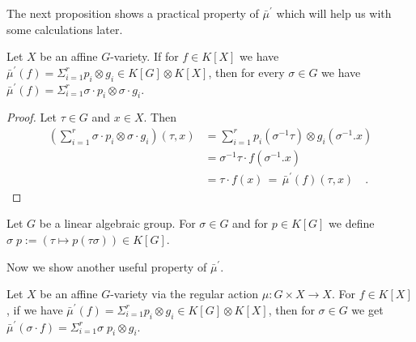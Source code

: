 The next proposition shows a practical property of $\bar{\mu}^\prime$ which will help us with some calculations later.
\begin{proposition}\label{rara}
  Let $X$ be an affine $G$-variety.
  If for $f \in K[X]$ we have $\bar{\mu}^\prime (f) = \Sigma_{i =1}^r p_i \otimes g_i \in K[G] \otimes K[X] $, then for every $\sigma \in G$ we have \linebreak$\bar{\mu}^\prime (f) = \Sigma_{i=1}^r \sigma\cdot p_i \otimes \sigma\cdot g_i$.
\end{proposition}

\begin{proof}
  Let $\tau \in G$ and $x \in X$.
  Then
  \begin{equation*}
    \begin{aligned}
      \left(\sum_{i=1}^r \sigma\cdot p_i \otimes \sigma\cdot g_i \right)(\tau,x)
      &= \sum_{i=1}^r p_i(\sigma^{-1}\tau) \otimes g_i (\sigma^{-1}.x)  \\
      &= \sigma^{-1}\tau\cdot f(\sigma^{-1}.x)  \\
      &= \tau\cdot f(x) \, = \, \bar{\mu}^\prime (f) (\tau,x) \quad .
    \end{aligned}
  \end{equation*}
\end{proof}


\begin{definition}\label{rac}
  Let $G$ be a linear algebraic group.
  For $\sigma \in G$ and for $p \in K[G]$ we define  $\sigma\dot{\phantom{.}}p := (\tau \mapsto p(\tau\sigma)) \in K[G]$.
\end{definition}

Now we show another useful property of $\bar{\mu}^\prime$.

\begin{proposition}\label{roro}
  Let $X$ be an affine $G$-variety via the regular action \linebreak$\mu \colon G \times X \rightarrow X$.
  For $f \in K[X]$, if we have $\bar{\mu}^\prime (f) = \Sigma_{i = 1}^r p_i \otimes g_i \in K[G] \otimes K[X]$, then for $\sigma \in G$ we get $\bar{\mu}^\prime (\sigma\cdot f) = \Sigma_{i = 1}^r \sigma \dot{\phantom{.}} p_i \otimes g_i$.
\end{proposition}


